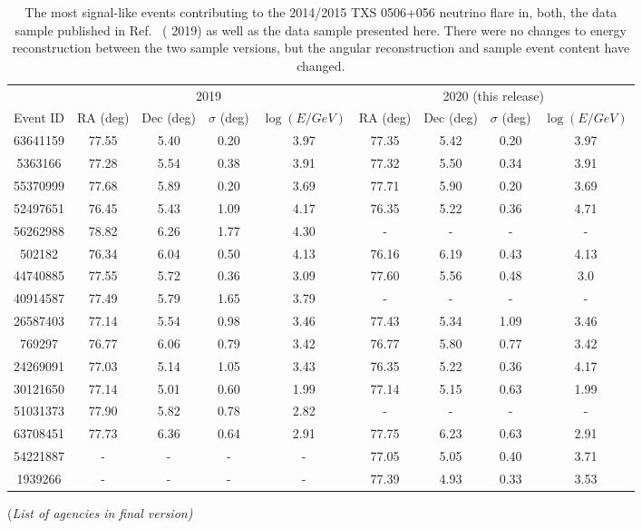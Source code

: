 \documentclass[aps,10pt,prd,twocolumn,floats,letterpaper,showpacs,nofootinbib,bibnotes,notitlepage,superscriptaddress,floatfix]{revtex4-1}
\newcommand{\MA}[1]{{\color{magenta}#1}}
\begin{document}
\begin{table}[p]
\centering
\begin{ruledtabular}
\begin{tabular}{c|cccc|cccc}
\multicolumn{1}{c|}{} &
\multicolumn{4}{c|}{\MA{{\tt PSTracks} 2019}~\cite{IceCube:2018cha,IceCube:2019}} & 
\multicolumn{4}{c}{\MA{{\tt PSTracks} 2020 (this release)}}\\[0.1cm]
Event ID & RA (deg) & Dec (deg) & $\sigma$ (deg) & $\log(E/GeV)$ & RA (deg) & Dec (deg) & $\sigma$ (deg) & $\log(E/GeV)$\\ 
\hline
63641159 & 77.55 & 5.40 & 0.20 & 3.97 & 77.35 & 5.42 & 0.20 & 3.97\\
5363166 & 77.28 & 5.54 & 0.38 & 3.91 & 77.32 & 5.50 & 0.34 & 3.91\\
55370999 & 77.68 & 5.89 & 0.20 & 3.69 & 77.71 & 5.90 & 0.20 & 3.69\\
52497651 & 76.45 & 5.43 & 1.09 & 4.17 & 76.35 & 5.22 & 0.36 & 4.71\\
56262988 & 78.82 & 6.26 & 1.77 & 4.30 & - & - & - & - \\
502182 & 76.34 & 6.04 & 0.50 & 4.13 & 76.16 & 6.19 & 0.43 & 4.13 \\
44740885 & 77.55 & 5.72 & 0.36 & 3.09 & 77.60 & 5.56 & 0.48 & 3.0 \\
40914587 & 77.49 & 5.79 & 1.65 & 3.79 & - & - & - & -  \\
26587403 & 77.14 & 5.54 & 0.98 & 3.46 & 77.43 & 5.34 & 1.09 & 3.46 \\
769297 & 76.77 & 6.06 & 0.79 & 3.42 & 76.77 & 5.80 & 0.77 & 3.42 \\
24269091 & 77.03 & 5.14 & 1.05 & 3.43 & 76.35 & 5.22 & 0.36 & 4.17 \\
30121650 & 77.14 & 5.01 & 0.60 & 1.99 & 77.14 & 5.15 & 0.63 & 1.99 \\
51031373 & 77.90 & 5.82 & 0.78 & 2.82 & - & - & - & - \\
63708451 & 77.73 & 6.36 & 0.64 & 2.91 & 77.75 & 6.23 & 0.63 & 2.91 \\
54221887 & - & - & - & - & 77.05 & 5.05 & 0.40 & 3.71 \\
1939266 & - & - & - & - & 77.39 & 4.93 & 0.33 & 3.53 \\
\end{tabular}
\end{ruledtabular}
\caption[]{The most signal-like events contributing to the 2014/2015 TXS 0506+056 neutrino flare in, \MA{both, the data sample published in Ref.~\cite{IceCube:2019}} (\MA{{\tt PSTracks} 2019}) as well as the data sample presented here. There were no changes to energy reconstruction between the two sample versions, but the angular reconstruction and sample event content have changed.}\label{tab:TXSFlareEvtsTable}
\end{table}

\begin{acknowledgements}
\begin{center}\MA{(\it List of agencies in final version)}\end{center}
%
\end{acknowledgements}




\end{document}
